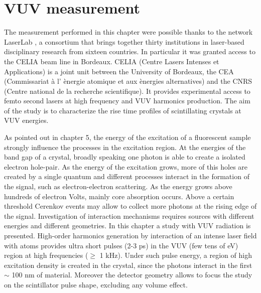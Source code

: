 
\chapter{VUV measurement}
The measurement performed in this chapter were possible thanks to the network LaserLab \cite{LaserLab}, a consortium that brings together thirty institutions in laser-based disciplinary research from sixteen countries. In particular it was granted access to the CELIA beam line in Bordeaux.
CELIA (Centre Lasers Intenses et Applications) is a joint unit between the University of Bordeaux, the CEA (Commissariat à l' \`{e}nergie atomique et aux \`{e}nergies alternatives) and the CNRS (Centre national de la recherche scientifique). It provides experimental access to femto second lasers at high frequency and VUV harmonics production.
The aim of the study is to characterize the rise time profiles of scintillating crystals at VUV energies.

As pointed out in chapter 5, the energy of the excitation of a fluorescent sample strongly influence the processes in the excitation region.
At the energies of the band gap of a crystal, broadly speaking one photon is able to create a isolated electron hole-pair. As the energy of the excitation grows, more of this holes are created by a single quantum and different processes interact in the formation of the signal, such as electron-electron scattering.
As the energy grows above hundreds of electron Volts, mainly core absorption occurs. 
Above a certain threshold Cerenkov events may allow to collect more photons at the rising edge of the signal. 
Investigation of interaction mechanisms requires sources with different energies and different geometries.
In this chapter a study with VUV radiation is presented. High-order harmonics generation by interaction of an intense laser field with atoms provides ultra short pulses (2-3 ps) in the VUV (few tens of eV) region at high frequencies ($\geq$ 1 kHz). 
Under such pulse energy, a region of high excitation density is created in the crystal, since the photons interact in the first $\sim$ 100 nm of material.
Moreover the detector geometry allows to focus the study on the scintillator pulse shape, excluding any volume effect.

